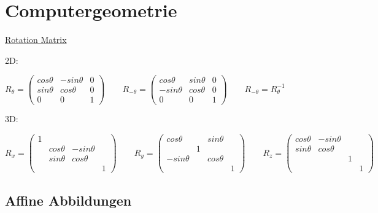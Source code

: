 \documentclass[fleqn]{article}
\begin{document}
\section{Computergeometrie}

\noindent\underline{Rotation Matrix}

\noindent 2D:

$R_\theta = \begin{pmatrix}
    cos\theta & -sin\theta&0\\
    sin\theta&cos\theta&0\\
    0&0&1
\end{pmatrix}\qquad
R_{-\theta}=\begin{pmatrix}
    cos\theta & sin\theta&0\\
    -sin\theta&cos\theta&0\\
    0&0&1
\end{pmatrix}\qquad R_{-\theta}=R_\theta^{-1}$

\noindent 3D:

$R_x=\begin{pmatrix}
    1\\
    &cos\theta&-sin\theta\\
    &sin\theta&cos\theta\\
    &&&1
\end{pmatrix}\qquad 
R_y=\begin{pmatrix}
    cos\theta&&sin\theta\\
    &1\\
    -sin\theta&&cos\theta\\
    &&&1
\end{pmatrix}\qquad
R_z=\begin{pmatrix}
    cos\theta & -sin\theta\\
    sin\theta&cos\theta\\
    &&1\\
    &&&1
\end{pmatrix}$

\subsection{Affine Abbildungen}
\end{document}
